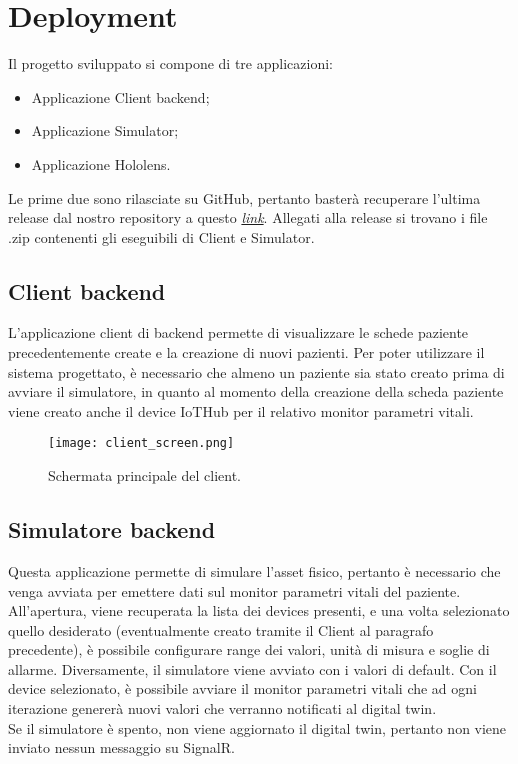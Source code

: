 \chapter{Deployment}
Il progetto sviluppato si compone di tre applicazioni:

\begin{itemize}
    \item Applicazione Client backend;
    \item Applicazione Simulator;
    \item Applicazione Hololens.
\end{itemize}

Le prime due sono rilasciate su GitHub, pertanto basterà recuperare l'ultima release dal nostro repository a questo \href{https://github.com/lucagiorgettismp/AzureHealthcareDigitalTwins/releases}{\textit{link}}.
Allegati alla release si trovano i file .zip contenenti gli eseguibili di Client e Simulator.

\section{Client backend}
L'applicazione client di backend permette di visualizzare le schede paziente precedentemente create e la creazione di nuovi pazienti. Per poter utilizzare il sistema progettato, è necessario che almeno un paziente sia stato creato prima di avviare il simulatore, in quanto al momento della creazione della scheda paziente viene creato anche il device IoTHub per il relativo monitor parametri vitali.

\begin{figure}[H]
    \texttt{[image: client\_screen.png]}
    \centering
    \caption{\label{pic:client-deployment}Schermata principale del client.}
\end{figure}

\section{Simulatore backend}
Questa applicazione permette di simulare l'asset fisico, pertanto è necessario che venga avviata per emettere dati sul monitor parametri vitali del paziente. \newline \newline All'apertura, viene recuperata la lista dei devices presenti, e una volta selezionato quello desiderato (eventualmente creato tramite il Client al paragrafo precedente), è possibile configurare range dei valori, unità di misura e soglie di allarme. Diversamente, il simulatore viene avviato con i valori di default.
Con il device selezionato, è possibile avviare il monitor parametri vitali che ad ogni iterazione genererà nuovi valori che verranno notificati al digital twin.\\
\newline Se il simulatore è spento, non viene aggiornato il digital twin, pertanto non viene inviato nessun messaggio su SignalR.

